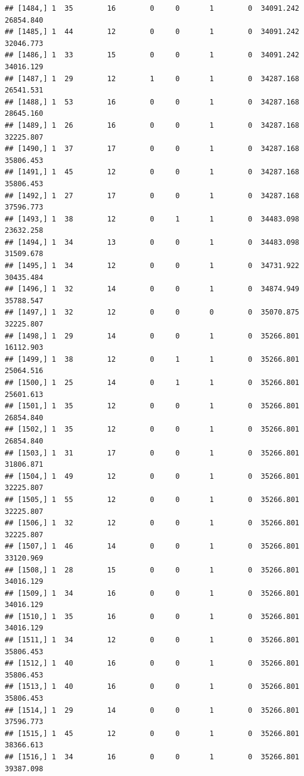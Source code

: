 \documentclass[
]{article}
\begin{document}
\begin{verbatim}
## [1484,] 1  35        16        0     0       1        0  34091.242  26854.840
## [1485,] 1  44        12        0     0       1        0  34091.242  32046.773
## [1486,] 1  33        15        0     0       1        0  34091.242  34016.129
## [1487,] 1  29        12        1     0       1        0  34287.168  26541.531
## [1488,] 1  53        16        0     0       1        0  34287.168  28645.160
## [1489,] 1  26        16        0     0       1        0  34287.168  32225.807
## [1490,] 1  37        17        0     0       1        0  34287.168  35806.453
## [1491,] 1  45        12        0     0       1        0  34287.168  35806.453
## [1492,] 1  27        17        0     0       1        0  34287.168  37596.773
## [1493,] 1  38        12        0     1       1        0  34483.098  23632.258
## [1494,] 1  34        13        0     0       1        0  34483.098  31509.678
## [1495,] 1  34        12        0     0       1        0  34731.922  30435.484
## [1496,] 1  32        14        0     0       1        0  34874.949  35788.547
## [1497,] 1  32        12        0     0       0        0  35070.875  32225.807
## [1498,] 1  29        14        0     0       1        0  35266.801  16112.903
## [1499,] 1  38        12        0     1       1        0  35266.801  25064.516
## [1500,] 1  25        14        0     1       1        0  35266.801  25601.613
## [1501,] 1  35        12        0     0       1        0  35266.801  26854.840
## [1502,] 1  35        12        0     0       1        0  35266.801  26854.840
## [1503,] 1  31        17        0     0       1        0  35266.801  31806.871
## [1504,] 1  49        12        0     0       1        0  35266.801  32225.807
## [1505,] 1  55        12        0     0       1        0  35266.801  32225.807
## [1506,] 1  32        12        0     0       1        0  35266.801  32225.807
## [1507,] 1  46        14        0     0       1        0  35266.801  33120.969
## [1508,] 1  28        15        0     0       1        0  35266.801  34016.129
## [1509,] 1  34        16        0     0       1        0  35266.801  34016.129
## [1510,] 1  35        16        0     0       1        0  35266.801  34016.129
## [1511,] 1  34        12        0     0       1        0  35266.801  35806.453
## [1512,] 1  40        16        0     0       1        0  35266.801  35806.453
## [1513,] 1  40        16        0     0       1        0  35266.801  35806.453
## [1514,] 1  29        14        0     0       1        0  35266.801  37596.773
## [1515,] 1  45        12        0     0       1        0  35266.801  38366.613
## [1516,] 1  34        16        0     0       1        0  35266.801  39387.098

\end{verbatim}
\end{document}
